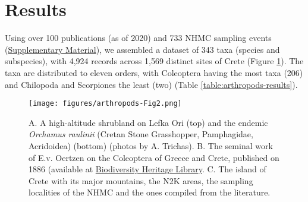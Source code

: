 \section{Results}
\label{sec:arthropods-results}

Using over 100 publications (as of 2020) and 733 NHMC sampling events
(\href{https://doi.org/10.5281/zenodo.10635645}{Supplementary Material}), we assembled a dataset of 343 taxa (species and subspecies),
with 4,924 records across 1,569 distinct sites of Crete (Figure \ref{fig:arthropods-fig2}). The taxa
are distributed to eleven orders, with Coleoptera having the most taxa (206)
and Chilopoda and Scorpiones the least (two) (Table \ref{table:arthropods-results}).

   \begin{figure}[ht]
      \centering
      \texttt{[image: figures/arthropods-Fig2.png]}
      \caption[The common endemicity hotspots of all orders]{A. A high-altitude shrubland on Lefka Ori (top) and the endemic \textit{Orchamus raulinii} (Cretan Stone Grasshopper, Pamphagidae, Acridoidea) (bottom) (photos by A. Trichas). B. The seminal work of E.v. Oertzen on the Coleoptera of Greece and Crete, published on 1886 (available at \href{https://www.biodiversitylibrary.org/page/32058852}{Biodiversity Heritage Library}. C. The island of Crete with its major mountains, the N2K areas, the sampling localities of the NHMC and the ones compiled from the literature.}
      \label{fig:arthropods-fig2}
   \end{figure}


